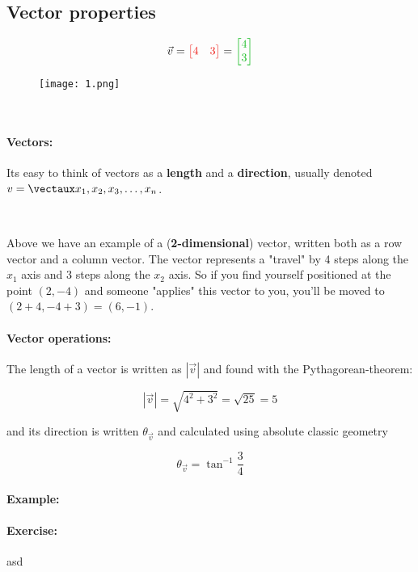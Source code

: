 \documentclass{article}
\begin{document}
\color{white}\subsection{Vector properties}\color{black}


\begin{minipage}{0.1\textwidth}
\quad
\end{minipage}
\begin{minipage}{0.25\textwidth}
\begin{align*}
\vec{v}  = \color{rooj} \begin{bmatrix} 4 & 3 \end{bmatrix}  \color{black}
 =  \color{groen} \begin{bmatrix} 4 \\ 3 \end{bmatrix}  \color{black}
\end{align*}
\end{minipage} \hfill
\begin{minipage}{0.4\textwidth}
\begin{figure}[H]
\texttt{[image: 1.png]}
\end{figure}
\end{minipage}
\begin{minipage}{0.1\textwidth}
\quad
\end{minipage}

\

\paragraph{Vectors: } Its easy to think of vectors as a \textbf{length} and a \textbf{direction}, usually denoted $v = \vect{x_1,  x_2,  x_3, \dots, x_n}$.

\

Above we have an example of  a (\textbf{2-dimensional}) vector, written both as a \color{rooj} row vector \color{black} and a \color{groen} column vector\color{black}. The vector represents a "travel" by 4 steps along the $x_1$ axis and 3 steps along the $x_2$ axis. So if you find yourself positioned at the point $(2,-4)$ and someone "applies" this vector to you, you'll be moved to $(2+4, -4+3) = (6,-1)$.

\paragraph{Vector operations: }


The length of a vector is written as $|\vec{v}|$ and found with the Pythagorean-theorem:

\[
|\vec{v}| = \sqrt{4^2 + 3^2} = \sqrt{25} = 5
\]

and its direction is written $\theta_{\vec{v}}$ and calculated using absolute classic geometry

\[
\theta_{\vec{v}} = \tan^{-1}\frac{3}{4} 
\]


\paragraph{Example: }

\paragraph{Exercise: } asd
\end{document}
